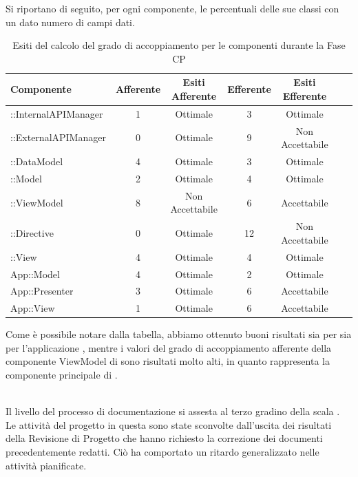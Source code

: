 Si riportano di seguito, per ogni componente, le percentuali delle sue classi con un dato numero di campi dati.
\begin{table}[H]
	\centering
		\begin{tabu}{| l | c | c | c | c | c | c | }
			\hline
			Componente	& Afferente & Esiti Afferente & Efferente & Esiti Efferente 	\\ \hline \hline
			::InternalAPIManager	& 1 & Ottimale & 3 & Ottimale  \\ \hline
			::ExternalAPIManager  & 0 & Ottimale & 9 & Non Accettabile   \\ \hline
			::DataModel  & 4 & Ottimale & 3 & Ottimale   \\ \hline
			::Model & 2 & Ottimale & 4 & Ottimale   \\ \hline
			::ViewModel & 8 & Non Accettabile & 6 & Accettabile   \\ \hline
			::Directive & 0 & Ottimale & 12 & Non Accettabile   \\ \hline
			::View & 4 & Ottimale & 4 & Ottimale   \\ \hline
			App::Model & 4 & Ottimale & 2 & Ottimale   \\ \hline
			App::Presenter & 3 & Ottimale & 6 & Accettabile   \\ \hline
			App::View & 1 & Ottimale & 6 & Accettabile   \\ \hline
		\end{tabu}
	\caption{Esiti del calcolo del grado di accoppiamento per le componenti durante la Fase CP}
\end{table}
Come è possibile notare dalla tabella, abbiamo ottenuto buoni risultati sia per  sia per l'applicazione , mentre i valori del grado di accoppiamento afferente della componente ViewModel di  sono risultati molto alti, in quanto rappresenta la componente principale di .
\\ \\
 

Il livello del processo di documentazione si assesta al terzo gradino della scala .
Le attività del progetto in questa  sono state sconvolte dall'uscita dei risultati della Revisione di Progetto che hanno richiesto la correzione dei documenti precedentemente redatti. Ciò ha comportato un ritardo generalizzato nelle attività pianificate.

